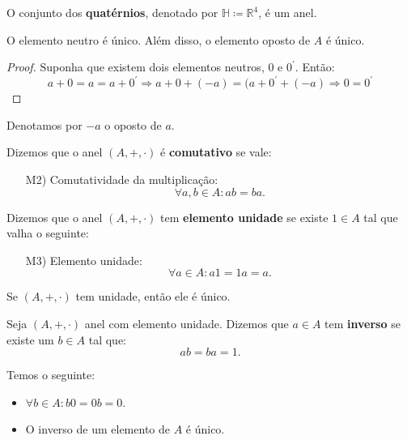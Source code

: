 \documentclass[11pt,twoside,a4paper]{book}
\begin{document}
\begin{exemplo}
O conjunto dos \textbf{quatérnios}, denotado por $\mathbb{H}\coloneqq\mathbb{R}^4$, é um anel.
\end{exemplo}

\begin{proposicao}
O elemento neutro é único. Além disso, o elemento oposto de $A$ é único.
\end{proposicao}
\begin{proof}
Suponha que existem dois elementos neutros, $0$ e $0^{\prime}.$ Então:
\[
a + 0 = a = a + 0^{\prime} \Rightarrow a + 0 + (-a) = (a + 0^{\prime} + (-a) \Rightarrow 0 = 0^{\prime}
\]
\end{proof}
\begin{notacao}
Denotamos por $-a$ o oposto de $a$.
\end{notacao}

\begin{definicao}
Dizemos que o anel $(A,+,\cdot)$ é \textbf{comutativo} se vale:
\begin{itemize}
\item[M2)] Comutatividade da multiplicação:
\[
\forall a,b\in A:ab=ba.
\]
\end{itemize}
\end{definicao}

\begin{definicao}
Dizemos que o anel $(A,+,\cdot)$ tem \textbf{elemento unidade} se existe $1\in A$ tal que valha o seguinte:
\begin{itemize}
\item[M3)] Elemento unidade:
\[
\forall a\in A:a1=1a=a.
\]
\end{itemize}

\end{definicao}

\begin{proposicao}
Se $(A,+,\cdot)$ tem unidade, então ele é único.
\end{proposicao}

\begin{definicao}
Seja $(A,+,\cdot)$ anel com elemento unidade. Dizemos que $a\in A$ tem \textbf{inverso} se existe um $b\in A$ tal que:
\[
ab=ba=1.
\]
\end{definicao}

\begin{proposicao}
Temos o seguinte:
\begin{itemize}
\item $\forall b\in A:b0=0b=0$.
\item O inverso de um elemento de $A$ é único.
\end{itemize}
\end{proposicao}
\end{document}

